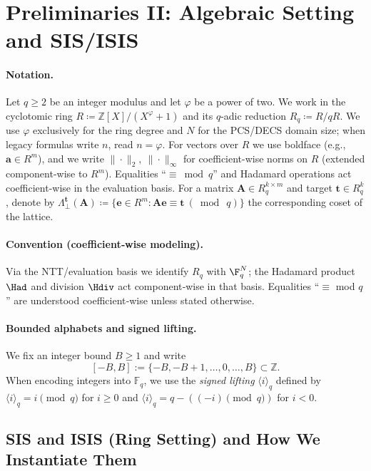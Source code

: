 \section{Preliminaries II: Algebraic Setting and SIS/ISIS}
\label{sec:prelim-algebra}

\paragraph{Notation.}
Let $q\ge 2$ be an integer modulus and let $\varphi$ be a power of two.
We work in the cyclotomic ring $R \coloneqq \mathbb{Z}[X]/(X^\varphi+1)$ and its $q$-adic reduction
$R_q \coloneqq R/qR$. We use $\varphi$ exclusively for the ring degree and $N$ for the PCS/DECS domain size; when legacy formulas write $n$, read $n=\varphi$.
For vectors over $R$ we use boldface (e.g., $\mathbf{a}\in R^m$), and we write
$\|\cdot\|_2,\ \|\cdot\|_\infty$ for coefficient-wise norms on $R$ (extended component-wise to $R^m$).
Equalities “$\equiv \bmod q$” and Hadamard operations act coefficient-wise in the evaluation basis.
For a matrix $\mathbf{A}\in R_q^{k\times m}$ and target $\mathbf{t}\in R_q^k$, denote by
$\Lambda^\mathbf{t}_\perp(\mathbf{A}) \coloneqq \{\mathbf{e}\in R^m : \mathbf{A}\mathbf{e}\equiv \mathbf{t}\ (\bmod\ q)\}$ the corresponding coset of the lattice.


\paragraph{Convention (coefficient‑wise modeling).}
Via the NTT/evaluation basis we identify $R_q$ with $\F_q^N$; the Hadamard product $\Had$ and division $\Hdiv$ act component‑wise in that basis.
Equalities “$\equiv$ mod $q$” are understood coefficient‑wise unless stated otherwise.

\paragraph{Bounded alphabets and signed lifting.}
We fix an integer bound $B\ge 1$ and write
\[
[-B,B] := \{-B,-B{+}1,\ldots,0,\ldots,B\}\subset\mathbb{Z}.
\]
When encoding integers into $\mathbb{F}_q$, we use the \emph{signed lifting} $\langle i\rangle_q$ defined by
$\langle i\rangle_q = i \pmod q$ for $i\ge 0$ and $\langle i\rangle_q = q - ((-i)\pmod q)$ for $i<0$.

\subsection{SIS and ISIS (Ring Setting) and How We Instantiate Them}


